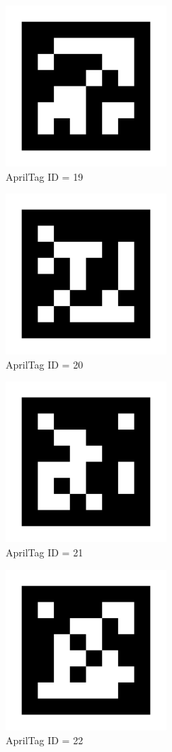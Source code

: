 \documentclass[1pt]{article}
\begin{document}
\clearpage
\begin{figure}[ht]
    \centering
    \includegraphics{AprilTag/tag31_11_00019.png}
    \caption{AprilTag ID = 19}
\end{figure}
\clearpage
\begin{figure}[ht]
    \centering
    \includegraphics{AprilTag/tag31_11_00020.png}
    \caption{AprilTag ID = 20}
\end{figure}
\clearpage
\begin{figure}[ht]
    \centering
    \includegraphics{AprilTag/tag31_11_00021.png}
    \caption{AprilTag ID = 21}
\end{figure}
\clearpage
\begin{figure}[ht]
    \centering
    \includegraphics{AprilTag/tag31_11_00022.png}
    \caption{AprilTag ID = 22}
\end{figure}
\end{document}
